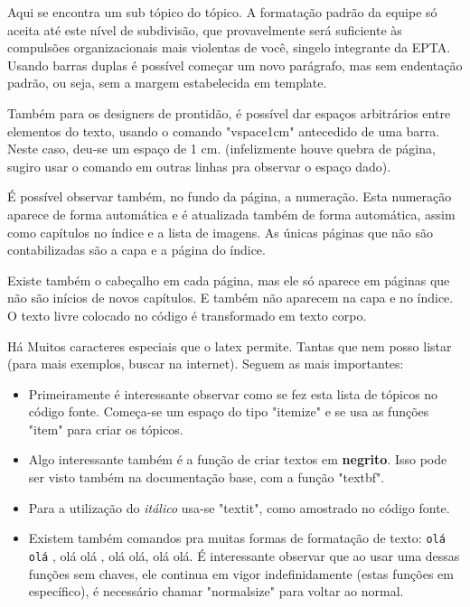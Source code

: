Aqui se encontra um sub tópico do tópico. A formatação padrão da equipe só aceita até este nível de subdivisão, que provavelmente será suficiente às compulsões organizacionais mais violentas de você, singelo integrante da EPTA. \\
Usando barras duplas é possível começar um novo parágrafo, mas sem endentação padrão, ou seja, sem a margem estabelecida em template.  

Também para os designers de prontidão, é possível dar espaços arbitrários entre elementos do texto, usando o comando "vspace{1cm}" antecedido de uma barra. Neste caso, deu-se um espaço de 1 cm. (infelizmente houve quebra de página, sugiro usar o comando em outras linhas pra observar o espaço dado).

\vspace{1cm}

É possível observar também, no fundo da página, a numeração. Esta numeração aparece de forma automática e é atualizada também de forma automática, assim como capítulos no índice e a lista de imagens. As únicas páginas que não são contabilizadas são a capa e a página do índice.

Existe também o cabeçalho em cada página, mas ele só aparece em páginas que não são inícios de novos capítulos. E também não aparecem na capa e no índice. O texto livre colocado no código é transformado em texto corpo.

Há Muitos caracteres especiais que o latex permite. Tantas que nem posso listar (para mais exemplos, buscar na internet). Seguem as mais importantes:

\begin{itemize}
	\item Primeiramente é interessante observar como se fez esta lista de tópicos no código fonte. Começa-se um espaço do tipo "itemize" e se usa as funções "item" para criar os tópicos. 
	\item Algo interessante também é a função de criar textos em \textbf{negrito}. Isso pode ser visto também na documentação base, com a função "textbf".
	\item Para a utilização do  \textit{itálico} usa-se "textit", como amostrado no código fonte.
	\item Existem também comandos pra muitas formas de formatação de texto: \texttt{olá olá} , \LARGE olá olá , \normalsize olá olá, \scriptsize olá olá. \normalsize É interessante observar que ao usar uma dessas funções sem chaves, ele continua em vigor indefinidamente (estas funções em específico), é necessário chamar "normalsize" para voltar ao normal. 
\end{itemize}

